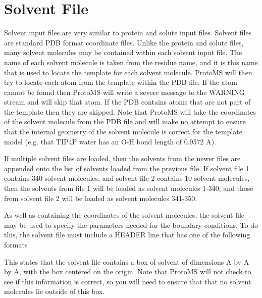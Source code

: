 \documentclass[letterpaper,10pt,english]{sphinxmanual}
\begin{document}
\section{Solvent File}
\label{\detokenize{protoms:solvent-file}}\label{\detokenize{protoms:solventpdb}}
Solvent input files are very similar to protein and solute input files. Solvent files are standard PDB format coordinate files. Unlike the protein and solute files, many solvent molecules may be contained within each solvent input file. The name of each solvent molecule is taken from the residue name, and it is this name that is used to locate the template for each solvent molecule. ProtoMS will then try to locate each atom from the template within the PDB file. If the atom cannot be found then ProtoMS will write a severe message to the WARNING stream and will skip that atom. If the PDB contains atoms that are not part of the template then they are skipped. Note that ProtoMS will take the coordinates of the solvent molecule from the PDB file and will make no attempt to ensure that the internal geometry of the solvent molecule is correct for the template model (e.g. that
TIP4P water has an O-H bond length of 0.9572 A).

If multiple solvent files are loaded, then the solvents from the newer files are appended onto the list of solvents loaded from the previous file. If solvent file 1 contains 340 solvent molecules, and solvent file 2 contains 10 solvent molecules, then the solvents from file 1 will be loaded as solvent molecules 1-340, and those from solvent file 2 will be loaded as solvent molecules 341-350.


As well as containing the coordinates of the solvent molecules, the solvent file may be used to specify the parameters needed for the boundary conditions. To do this, the solvent file must include a HEADER line that has one of the following formats

%
\begin{sphinxVerbatim}[commandchars=\\\{\}]
    
\end{sphinxVerbatim}

This states that the solvent file contains a box of solvent of dimensions  A by  A by  A, with the box centered on the origin. Note that ProtoMS will not check to see if this information is correct, so you will need to ensure that that no solvent molecules lie outside of this box.
\end{document}
